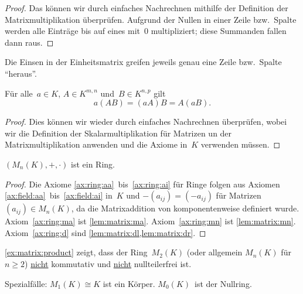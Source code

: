 \documentclass[a4paper]{article}
\begin{document}
\begin{proof}
    Das können wir durch einfaches Nachrechnen mithilfe der Definition der Matrixmultiplikation überprüfen. Aufgrund der Nullen in einer Zeile bzw.\ Spalte werden alle Einträge bis auf eines mit~$0$ multipliziert; diese Summanden fallen dann raus.
\end{proof}

Die Einsen in der Einheitsmatrix greifen jeweils genau eine Zeile bzw.\ Spalte "`heraus"'.

\begin{lemma}\label{lem:matrix:mcomp}
    Für alle~$a \in K$, $A \in K^{m,n}$ und~$B \in K^{n,p}$ gilt
    \begin{equation*}
        a(AB) = (aA)B = A(aB).
    \end{equation*}
\end{lemma}

\begin{proof}
    Dies können wir wieder durch einfaches Nachrechnen überprüfen, wobei wir die Definition der Skalarmultiplikation für Matrizen un der Matrixmultiplikation anwenden und die Axiome in~$K$ verwenden müssen.
\end{proof}

\begin{lemma}
    $(M_n(K),+,\cdot)$ ist ein Ring.
\end{lemma}

\begin{proof}
    Die Axiome \ref{ax:ring:aa}~bis~\ref{ax:ring:ai} für Ringe folgen aus Axiomen \ref{ax:field:aa}~bis~\ref{ax:field:ai} in~$K$ und $-(a_{ij}) = (-a_{ij})$ für Matrizen~$(a_{ij}) \in M_n(K)$, da die Matrixaddition von komponentenweise definiert wurde. Axiom~\ref{ax:ring:ma} ist \cref{lem:matrix:ma}. Axiom~\ref{ax:ring:mn} ist \cref{lem:matrix:mn}. Axiom~\ref{ax:ring:d} sind \cref{lem:matrix:dl,lem:matrix:dr}.
\end{proof}

\begin{remark}
    \cref{ex:matrix:product} zeigt, dass der Ring~$M_2(K)$ (oder allgemein $M_n(K)$ für~$n \geq 2$) \underline{nicht} kommutativ und \underline{nicht} nullteilerfrei ist.

    Spezialfälle: $M_1(K) \cong K$ ist ein Körper. $M_0(K)$~ist der Nullring.
\end{remark}
\end{document}
